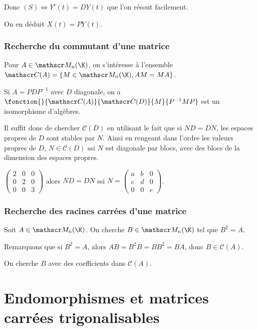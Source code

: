 Donc $(S) \iff Y'(t) = D Y(t)$ que l'on résout facilement. 

On en déduit $X(t) = P Y(t)$.

\subsubsection{Recherche du commutant d'une matrice }

Pour $A \in \mathscr M_n(\K)$, on s'intéresse à l'ensemble $\mathscr C(A) = \{M \in \mathscr M_n(\K), AM = MA\}$.

Si $A = PDP^{-1}$ avec $D$ diagonale, on a 
$\fonction{}{\mathscr C (A)}{\mathscr C(D)}{M}{P^{-1} M P}$ est un isomorphisme d'algèbres.

Il suffit donc de chercher $\mathscr C(D)$ en utilisant le fait que si 
$ND = DN$, les espaces propres de $D$ sont stables par $N$. Ainsi en rengeant dans l'ordre les valeurs propres
de $D$, $N \in \mathscr C(D)$ ssi $N$ est diagonale par blocs, avec des blocs de la dimension des espaces propres. 

\begin{exemple}
    $\begin{pmatrix}
        2 & 0 & 0 \\
        0 & 2 & 0 \\
        0 & 0 & 3
    \end{pmatrix}$ alors $ND = DN$ ssi $N = \begin{pmatrix}
        a & b & 0 \\
        c & d & 0 \\
        0 & 0 & e
    \end{pmatrix}$.
\end{exemple}

\subsubsection{Recherche des racines carrées d'une matrice }

Soit $A \in \mathscr M_n(\K)$. On cherche $B \in \mathscr M_n(\K)$ tel que $B^2 = A$.

Remarquons que si $B^2 = A$, alors $AB = B^2B = BB^2 = BA$, donc $B \in \mathscr C(A)$.

On cherche $B$ avec des coefficients dans $\mathscr C(A)$.

\section{Endomorphismes et matrices carrées trigonalisables}
